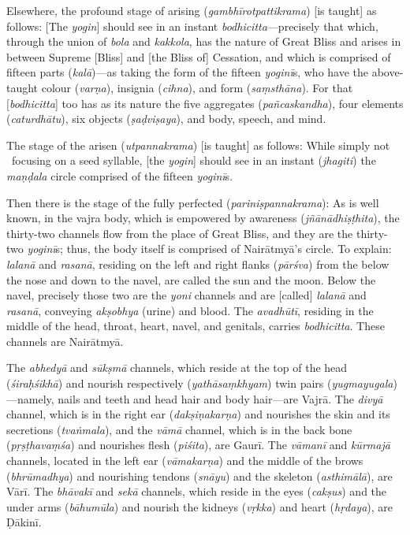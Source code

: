 \documentclass[naipra.tex]{subfiles}
\begin{document}
Elsewhere, the profound stage of arising (\emph{gambhīrotpattikrama}) [is taught] as follows:
[The \emph{yogin}] should see in an instant \emph{bodhicitta}—precisely that which, through the union of \emph{bola} and \emph{kakkola}, has the nature of Great Bliss and arises in between Supreme [Bliss] and [the Bliss of] Cessation, and which is comprised of fifteen parts (\emph{kalā})—as taking the form of the fifteen \emph{yoginī}s, who have the above-taught colour (\emph{varṇa}), insignia (\emph{cihna}), and form (\emph{saṃsthāna}).
For that [\emph{bodhicitta}] too has as its nature the five aggregates (\emph{pañcaskandha}), four elements (\emph{caturdhātu}), six objects (\emph{ṣaḍviṣaya}), and body, speech, and mind.

The stage of the arisen (\emph{utpannakrama}) [is taught] as follows:
While simply \crux not \crux\ focusing on a seed syllable, [the \emph{yogin}] should see in an instant (\emph{jhagiti}) the \emph{maṇḍala} circle comprised of the fifteen \emph{yoginī}s.

Then there is the stage of the fully perfected (\emph{pariniṣpannakrama}):
As is well known, in the vajra body, which is empowered by awareness (\emph{jñānādhiṣṭhita}), the thirty-two channels flow from the place of Great Bliss, and they are the thirty-two \emph{yoginī}s; thus, the body itself is comprised of Nairātmyā's circle.
To explain: \emph{lalanā} and \emph{rasanā}, residing on the left and right flanks (\emph{pārśva}) from the below the nose and down to the navel, are called the sun and the moon.
Below the navel, precisely those two are the \emph{yoni} channels and are [called] \emph{lalanā} and \emph{rasanā}, conveying \emph{akṣobhya} (urine) and blood.
The \emph{avadhūtī}, residing in the middle of the head, throat, heart, navel, and genitals, carries \emph{bodhicitta}.
These channels are Nairātmyā.

The \emph{abhedyā} and \emph{sūkṣmā} channels, which reside at the top of the head (\emph{śiraḥśikhā}) and nourish respectively (\emph{yathāsaṃkhyam}) twin pairs (\emph{yugmayugala})—namely, nails and teeth and head hair and body hair—are Vajrā.
The \emph{divyā} channel, which is in the right ear (\emph{dakṣiṇakarṇa}) and nourishes the skin and its secretions (\emph{tvaṅmala}), and the \emph{vāmā} channel, which is in the back bone (\emph{pṛṣṭhavaṃśa}) and nourishes flesh (\emph{piśita}), are Gaurī.
The \emph{vāmanī} and \emph{kūrmajā} channels, located in the left ear (\emph{vāmakarṇa}) and the middle of the brows (\emph{bhrūmadhya}) and nourishing tendons (\emph{snāyu}) and the skeleton (\emph{asthimālā}), are Vārī.
The \emph{bhāvakī} and \emph{sekā} channels, which reside in the eyes (\emph{cakṣus}) and the under arms (\emph{bāhumūla}) and nourish the kidneys (\emph{vṛkka}) and heart (\emph{hṛdaya}), are Ḍākinī.
\end{document}
